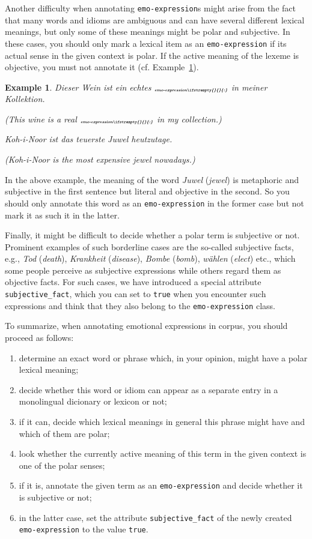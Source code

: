 \documentclass[11pt,a4paper]{article}
\theoremstyle{mytheoremstyle}
\newtheorem{exmp}{Example}[section]
\newcommand{\mtag}[2]{{\upshape[\emph{#2}\upshape]$_{\textrm{\bfseries\emph{\tiny
        #1}}}$}}
\newcommand{\emoexpression}[2][]{\mtag{emo-\-ex\-pression\ifstrempty{#1}{}{:#1}}{#2}}
\begin{document}
Another difficulty when annotating \texttt{emo-expression}s might
arise from the fact that many words and idioms are ambiguous and can
have several different lexical meanings, but only some of these
meanings might be polar and subjective.  In these cases, you should
only mark a lexical item as an \texttt{emo-expression} if its actual
sense in the given context is polar.  If the active meaning of the
lexeme is objective, you must not annotate it
(cf. Example~\ref{exmp:emo-expression-jewel}).
\begin{exmp}
  Dieser Wein ist ein echtes \emoexpression{Juwel} in meiner
  Kollektion.

  (This wine is a real \emoexpression{jewel} in my collection.)

  Koh-i-Noor ist das teuerste Juwel heutzutage.

  (Koh-i-Noor is the most expensive jewel nowadays.)\label{exmp:emo-expression-jewel}
\end{exmp}
\noindent{}In the above example, the meaning of the word
\textit{Juwel} (\textit{jewel}) is metaphoric and subjective in the
first sentence but literal and objective in the second.  So you should
only annotate this word as an \texttt{emo-expression} in the former
case but not mark it as such it in the latter.

Finally, it might be difficult to decide whether a polar term is
subjective or not.  Prominent examples of such borderline cases are
the so-called subjective facts, e.g., \emph{Tod} (\emph{death}),
\emph{Krankheit} (\emph{disease}), \emph{Bombe} (\emph{bomb}),
\emph{w\"ahlen} (\emph{elect}) etc., which some people perceive as
subjective expressions while others regard them as objective facts.
For such cases, we have introduced a special attribute
\texttt{subjective\_fact}, which you can set to \texttt{true} when you
encounter such expressions and think that they also belong to the
\texttt{emo-expression} class.

To summarize, when annotating emotional expressions in corpus, you
should proceed as follows:
\begin{enumerate}
  \item determine an exact word or phrase which, in your opinion,
    might have a polar lexical meaning;
  \item decide whether this word or idiom can appear as a separate
    entry in a monolingual dicionary or lexicon or not;
  \item if it can, decide which lexical meanings in general this
    phrase might have and which of them are polar;
  \item look whether the currently active meaning of this term in the
    given context is one of the polar senses;
  \item if it is, annotate the given term as an
    \texttt{emo-expression} and decide whether it is subjective or
    not;
  \item in the latter case, set the attribute \texttt{subjective\_fact}
    of the newly created \texttt{emo-expression} to the value
    \texttt{true}.
\end{enumerate}
\end{document}
